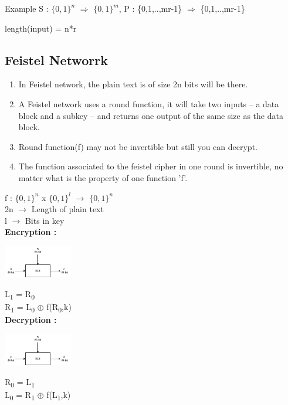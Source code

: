 \documentclass[11pt]{article}
\begin{document}
	Example  S : $\{0,1\}^n$ $\Rightarrow$ $\{0,1\}^m$, P : \{0,1,..,mr-1\} $\Rightarrow$ \{0,1,..,mr-1\}
	
	length(input) = n*r
	
	\subsection{Feistel Networrk}
	\begin{enumerate}
		\item In Feistel network, the plain text is of size 2n bits will be there.
		\item A Feistel network uses a round function, it will take two inputs – a data block and a subkey – and returns one output of the same size as the data block. 
		\item Round function(f) may not be invertible but still you can decrypt.
		\item The function associated to the feistel cipher in one round is invertible, no matter what is the property of one function 'f'.
	\end{enumerate}
	f : $\{0,1\}^n$ x $\{0,1\}^l$ $\rightarrow$ $\{0,1\}^n$\\
	2n $\rightarrow$ Length of plain text\\
	l $\rightarrow$ Bits in key\\
	\textbf{Encryption :}\vspace{0.1cm}\\
	\begin{center}
		\includegraphics[width=3cm]{encryption.jpg} \vspace{0.2cm}\\
	\end{center}
	L\textsubscript{1} = R\textsubscript{0}\\
	R\textsubscript{1} = L\textsubscript{0} $\oplus$ f(R\textsubscript{0},k)\\
	\textbf{Decryption :}\vspace{0.1cm}\\
	\begin{center}
		\includegraphics[width=3cm]{decryption.jpg} \vspace{0.2cm}\\
	\end{center}
	R\textsubscript{0} = L\textsubscript{1}\\
	L\textsubscript{0} = R\textsubscript{1} $\oplus$ f(L\textsubscript{1},k)\\
\end{document}
